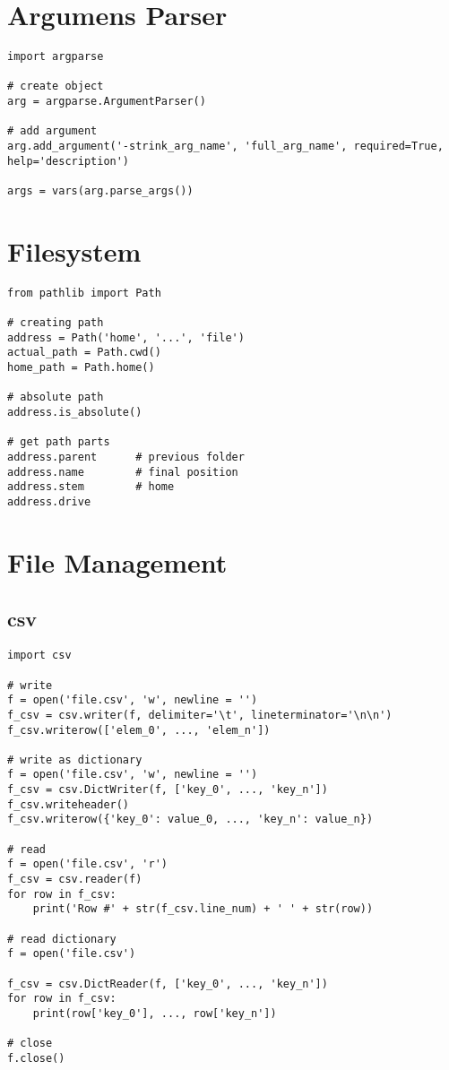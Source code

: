 \section{Argumens Parser}

\begin{verbatim}
import argparse

# create object
arg = argparse.ArgumentParser()

# add argument
arg.add_argument('-strink_arg_name', 'full_arg_name', required=True, help='description')

args = vars(arg.parse_args())
\end{verbatim}



\section{Filesystem}

\begin{verbatim}
from pathlib import Path

# creating path
address = Path('home', '...', 'file')
actual_path = Path.cwd()
home_path = Path.home()

# absolute path
address.is_absolute()

# get path parts
address.parent      # previous folder
address.name        # final position
address.stem        # home
address.drive
\end{verbatim}



\section{File Management}

\subsection{csv}

\begin{verbatim}
import csv

# write
f = open('file.csv', 'w', newline = '')
f_csv = csv.writer(f, delimiter='\t', lineterminator='\n\n')
f_csv.writerow(['elem_0', ..., 'elem_n'])

# write as dictionary
f = open('file.csv', 'w', newline = '')
f_csv = csv.DictWriter(f, ['key_0', ..., 'key_n'])
f_csv.writeheader()
f_csv.writerow({'key_0': value_0, ..., 'key_n': value_n})

# read
f = open('file.csv', 'r')
f_csv = csv.reader(f)
for row in f_csv:
    print('Row #' + str(f_csv.line_num) + ' ' + str(row))

# read dictionary
f = open('file.csv')

f_csv = csv.DictReader(f, ['key_0', ..., 'key_n'])
for row in f_csv:
    print(row['key_0'], ..., row['key_n'])

# close
f.close()
\end{verbatim}


